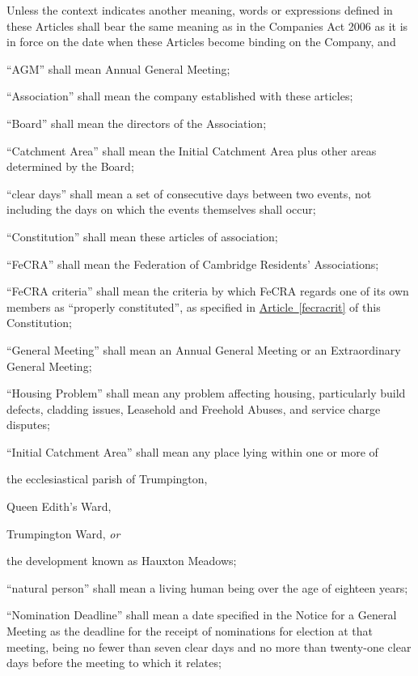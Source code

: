 \documentclass[12pt]{article}
\newcommand{\EC}[0]{Board}
\newcommand{\LAFA}[0]{Leasehold and Freehold Abuses}
\newcommand{\ITor}[0]{\textit{or}}
\newcommand{\definition}[2]{\item ``#1'' shall mean #2}
\newcommand{\articleref}[1]{\hyperref[#1]{Article~\ref*{#1}}}
\begin{document}
Unless the context indicates another meaning, words or expressions
defined in these Articles shall bear the same meaning as in the
Companies Act 2006 as it is in force on the date when these Articles
become binding on the Company, and

  \begin{constenum}

    \definition{AGM}{Annual General Meeting};

    \definition{Association}{the company established with these articles};

    \definition{\EC{}}{the directors of the Association};

    \definition{Catchment Area}{the Initial Catchment Area plus
      other areas determined by the \EC{}};

    \definition{clear days}{a set of consecutive days between two events, not
      including the days on which the events themselves shall occur};

    \definition{Constitution}{these articles of association};

    \definition{FeCRA}{the Federation of Cambridge Residents'
      Associations};

    \definition{FeCRA criteria}{the criteria by which FeCRA regards
      one of its own members as ``properly constituted'', as specified
      in \articleref{fecracrit} of this Constitution};

    \definition{General Meeting}{an Annual General Meeting or an
      Extraordinary General Meeting};

    \definition{Housing Problem}{any problem affecting housing,
      particularly build defects, cladding issues, 
      \LAFA, and service charge disputes};

    \definition{Initial Catchment Area}{any place lying
      within one or more of
      \begin{constenum}
      \item the ecclesiastical parish of Trumpington,
      \item Queen Edith's Ward,
      \item Trumpington Ward,
        \ITor
      \item the development known as Hauxton Meadows;
      \end{constenum}
    }

    \definition{natural person}{a living human being over the age of eighteen
      years};

    \definition{Nomination Deadline}{a date specified in the Notice for
      a General Meeting as the deadline for the receipt of nominations
      for election at that meeting, being no fewer than seven clear
      days and no more than twenty-one clear days before the meeting
      to which it relates};


\end{constenum}
\end{document}
